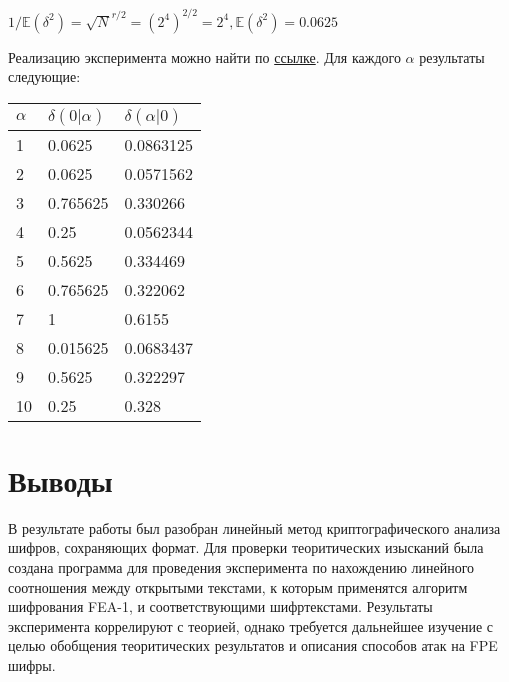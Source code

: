 \documentclass[utf8x, 14pt]{G7-32} %
\begin{document}
$1/\mathbb{E}(\delta^2)=\sqrt{N}^{r/2} = (2^4)^{2/2} = 2^4, \mathbb{E}(\delta^2) = 0.0625$

Реализацию эксперимента можно найти по \href{https://github.com/jerrydie/course_work}{ссылке}. Для каждого $\alpha$ результаты следующие:

\begin{center}
\begin{tabular}{ |p{}| p{}| p{}| }
\hline
 $\alpha$ & $\delta(0|\alpha )$ & $\delta(\alpha|0)$ \\
 \hline
1 & 0.0625 & 0.0863125 \\
2 & 0.0625 & 0.0571562 \\
3 & 0.765625 & 0.330266 \\
4 & 0.25 & 0.0562344 \\
5 & 0.5625 & 0.334469 \\
6 & 0.765625 & 0.322062 \\
7 & 1 & 0.6155 \\
8 & 0.015625 & 0.0683437 \\
9 & 0.5625 & 0.322297 \\
10 & 0.25 & 0.328 \\
\hline
\end{tabular}
\end{center}

\section{Выводы}
В результате работы был разобран линейный метод криптографического анализа шифров, сохраняющих формат. Для проверки теоритических изысканий была создана программа для проведения эксперимента по нахождению линейного соотношения между открытыми текстами, к которым применятся алгоритм шифрования FEA-1, и соответствующими шифртекстами. Результаты эксперимента коррелируют с теорией, однако требуется дальнейшее изучение с целью обобщения теоритических результатов и описания способов атак на FPE шифры.





\backmatter %





%

%
\end{document}
